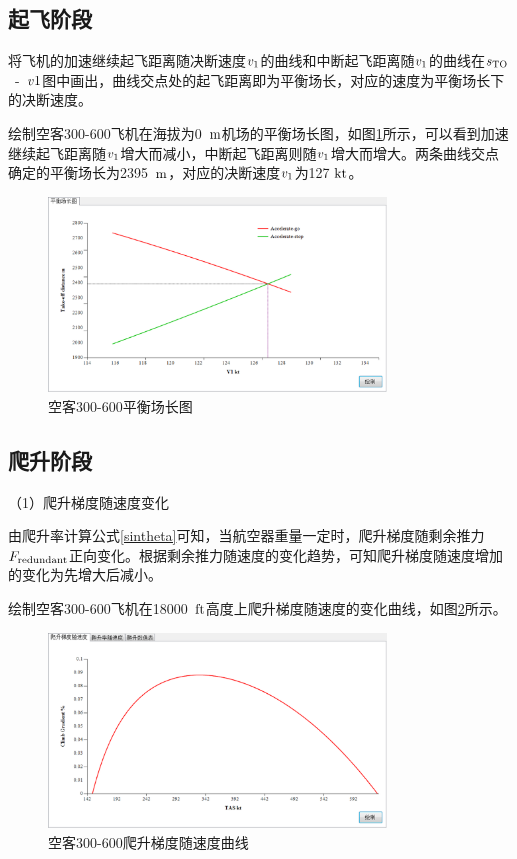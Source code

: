 \documentclass[a4paper,punct,space,heading=true,AutoFakeBold]{ctexrep}
\begin{document}
\subsection{起飞阶段}

将飞机的加速继续起飞距离随决断速度$v_{\rm 1}$的曲线和中断起飞距离随$v_{\rm 1}$的曲线在$s_{\rm TO}$\ -\ $v{\rm 1}$图中画出，曲线交点处的起飞距离即为平衡场长，对应的速度为平衡场长下的决断速度。

绘制空客300-600飞机在海拔为0\ $\rm m$机场的平衡场长图，如图\ref{balancedfieldlength}所示，可以看到加速继续起飞距离随$v_{\rm 1}$增大而减小，中断起飞距离则随$v_{\rm 1}$增大而增大。两条曲线交点确定的平衡场长为2395\ $\rm m$，对应的决断速度$v_{\rm 1}$为127 $\rm kt$。

\begin{figure}[h]
	\centering
	\includegraphics[width=0.8\textwidth]{pic/balancedfieldlength.eps}\hspace{30pt}
	\caption{空客300-600平衡场长图}\label{balancedfieldlength}
\end{figure}


\subsection{爬升阶段}

（1）爬升梯度随速度变化

由爬升率计算公式\ref{sintheta}可知，当航空器重量一定时，爬升梯度随剩余推力$F_{\rm redundant}$正向变化。根据剩余推力随速度的变化趋势，可知爬升梯度随速度增加的变化为先增大后减小。

绘制空客300-600飞机在18000\ $\rm ft$高度上爬升梯度随速度的变化曲线，如图\ref{cg}所示。

\begin{figure}[h]
	\centering
	\includegraphics[width=0.8\textwidth]{pic/cg.eps}\hspace{30pt}
	\caption{空客300-600爬升梯度随速度曲线}\label{cg}
\end{figure}
\end{document}
